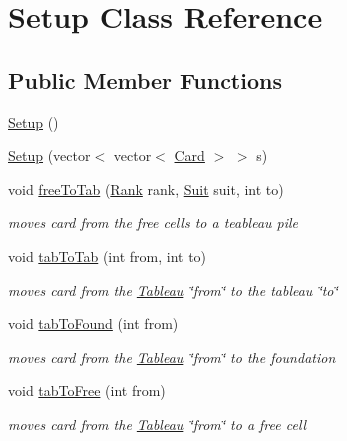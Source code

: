 \hypertarget{class_setup}{}\section{Setup Class Reference}
\label{class_setup}
\subsection*{Public Member Functions}
\begin{DoxyCompactItemize}
\item 
\hyperlink{class_setup_a0921e54e5a0200af117192e4c0c845b7}{Setup} ()
\item 
\hyperlink{class_setup_ae84ec0adca33996478fe9a226e6d2b2a}{Setup} (vector$<$ vector$<$ \hyperlink{class_card}{Card} $>$ $>$ s)
\item 
void \hyperlink{class_setup_a2b0bcfa40291817f662907720254d60b}{free\+To\+Tab} (\hyperlink{_card_a_d_t_8h_adf74d53cd68bbef55ba510b266ecbbed}{Rank} rank, \hyperlink{_card_a_d_t_8h_af78e1c8ea5e6837b6ab9452a1e435e4e}{Suit} suit, int to)
\begin{DoxyCompactList}\small\item\em moves card from the free cells to a teableau pile \end{DoxyCompactList}\item 
void \hyperlink{class_setup_ae424d4917db9cb013c904dbfcfa241e8}{tab\+To\+Tab} (int from, int to)
\begin{DoxyCompactList}\small\item\em moves card from the \hyperlink{class_tableau}{Tableau} \char`\"{}from\char`\"{} to the tableau \char`\"{}to\char`\"{} \end{DoxyCompactList}\item 
void \hyperlink{class_setup_a9356dbf0bccbfd14f5650297ef164479}{tab\+To\+Found} (int from)
\begin{DoxyCompactList}\small\item\em moves card from the \hyperlink{class_tableau}{Tableau} \char`\"{}from\char`\"{} to the foundation \end{DoxyCompactList}\item 
void \hyperlink{class_setup_a2d47948dfdaf388563bdcf090eb016e1}{tab\+To\+Free} (int from)
\begin{DoxyCompactList}\small\item\em moves card from the \hyperlink{class_tableau}{Tableau} \char`\"{}from\char`\"{} to a free cell \end{DoxyCompactList}\item 

\end{DoxyCompactItemize}
